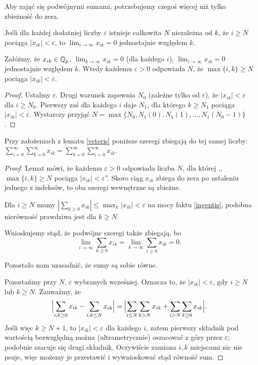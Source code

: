 Aby zająć się podwójnymi sumami, potrzebujemy czegoś więcej niż tylko zbieżność do zera.

\begin{definicja}
	Jeśli dla każdej dodatniej liczby $\varepsilon$ istnieje całkowita $N$ niezależna od $k$, że $i \ge N$ pociąga $|x_{ik}| < \varepsilon$, to $\lim_{i \to \infty} x_{ik} = 0$ jednostajnie względem $k$.
\end{definicja}

\begin{lemat} \label{veteris}
	Załóżmy, że $x_{ik} \in \mathbb Q_p$, $\lim_{k \to \infty} x_{ik} = 0$ (dla każdego $i$), $\lim_{i \to \infty} x_{ik} = 0$ jednostajnie względem $k$.
	Wtedy każdemu $\varepsilon > 0$ odpowiada $N$, że $\max \{i, k\} \ge N$ pociąga $|x_{ik}| < \varepsilon$.
\end{lemat}

\begin{proof}
	Ustalmy $\varepsilon$.
	Drugi warunek zapewnia $N_0$ (zależne tylko od $\varepsilon$), że $|x_{ik}| < \varepsilon$ dla $i \ge N_0$.
	Pierwszy zaś dla każdego $i$ daje $N_1$, dla którego $k \ge N_1$ pociąga $|x_{ik}| < \varepsilon$.
	Wystarczy przyjąć $N = \max\{N_0, N_1(0), N_1(1), \ldots, N_1(N_0-1)\}$.
\end{proof}

\begin{fakt} \label{caedis}
	Przy założeniach z lematu \ref{veteris} poniższe szeregi zbiegają do tej samej liczby: $\sum_{i = 0}^\infty \sum_{k = 0}^\infty x_{ik} = \sum_{k = 0}^\infty \sum_{i = 0}^\infty x_{ik}$.
\end{fakt}

\begin{proof}
	Lemat mówi, że każdemu $\varepsilon > 0$ odpowiada liczba $N$, dla której ,,$\max \{i, k\} \ge N$ pociąga $|x_{ik}| < \varepsilon$''.
	Skoro ciąg $x_{ik}$ zbiega do zera po ustaleniu jednego z indeksów, to oba szeregi wewnętrzne są zbieżne.

	Dla $i \ge N$ mamy $|\sum_{k \ge 0} x_{ik}| \le \max_k |x_{ik}| < \varepsilon$ na mocy faktu \ref{ingentis}, podobna nierówność prawdziwa jest dla $k \ge N$.
	
	Wnioskujemy stąd, że podwójne szeregi także zbiegają, bo
	\[
		\lim_{i \to \infty} \sum_{k \ge 0} x_{ik} = \lim_{k \to \infty} \sum_{i \ge 0} x_{ik} = 0.
	\]

	Pozostało nam uzasadnić, że sumy są sobie równe.

	Pozostańmy przy $N$, $\varepsilon$ wybranych wcześniej.
	Oznacza to, że $|x_{ik}| < \varepsilon$, gdy $i \ge N$ lub $k \ge N$.
	Zauważmy, że 
	\[
		\Bigl|\sum_{i, k \ge 0} x_{ik} - \sum_{i, k \le N} x_{ik} \Bigr| = 
		\Bigl|\sum_{i \le N} \sum_{k > N} x_{ik} + \sum_{i > N} \sum_{k \ge 0} x_{ik} \Bigr|.
	\]
	Jeśli więc $k \ge N+1$, to $|x_{ik}| < \varepsilon$ dla każdego $i$, zatem pierwszy składnik pod wartością bezwzględną można (ultrametrycznie) oszacować z góry przez $\varepsilon$; podobnie szacuje się drugi składnik. Oczywiście zamiana $i, k$ miejscami nic nie psuje, więc możemy je przestawić i wywnioskować stąd równość sum.
\end{proof}

